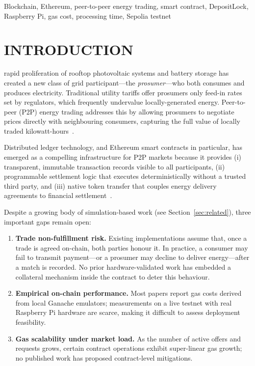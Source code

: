 \documentclass{IEEEoj}
\begin{document}
\begin{IEEEkeywords}
Blockchain, Ethereum, peer-to-peer energy trading, smart contract,
DepositLock, Raspberry Pi, gas cost, processing time, Sepolia testnet
\end{IEEEkeywords}

\maketitle

\section{INTRODUCTION}

 rapid proliferation of rooftop photovoltaic systems and
battery storage has created a new class of grid participant---the
\emph{prosumer}---who both consumes and produces electricity.
Traditional utility tariffs offer prosumers only feed-in rates set by
regulators, which frequently undervalue locally-generated energy.
Peer-to-peer (P2P) energy trading addresses this by allowing prosumers to
negotiate prices directly with neighbouring consumers, capturing the full
value of locally traded kilowatt-hours~\cite{sousa2019peer,zhang2018review}.

Distributed ledger technology, and Ethereum smart contracts in particular,
has emerged as a compelling infrastructure for P2P markets because it
provides (i) transparent, immutable transaction records visible to all
participants, (ii) programmable settlement logic that executes deterministically
without a trusted third party, and (iii) native token transfer that couples
energy delivery agreements to financial settlement~\cite{nakamoto2008bitcoin,
buterin2014ethereum}.

Despite a growing body of simulation-based work
(see Section~\ref{sec:related}), three important gaps remain open:

\begin{enumerate}
  \item \textbf{Trade non-fulfillment risk.}
        Existing implementations assume that, once a trade is agreed
        on-chain, both parties honour it.
        In practice, a consumer may fail to transmit payment---or a prosumer
        may decline to deliver energy---after a match is recorded.
        No prior hardware-validated work has embedded a collateral mechanism
        inside the contract to deter this behaviour.

  \item \textbf{Empirical on-chain performance.}
        Most papers report gas costs derived from local Ganache emulators;
        measurements on a live testnet with real Raspberry Pi hardware are
        scarce, making it difficult to assess deployment feasibility.

  \item \textbf{Gas scalability under market load.}
        As the number of active offers and requests grows, certain contract
        operations exhibit super-linear gas growth; no published work has
        proposed contract-level mitigations.
\end{enumerate}
\end{document}
